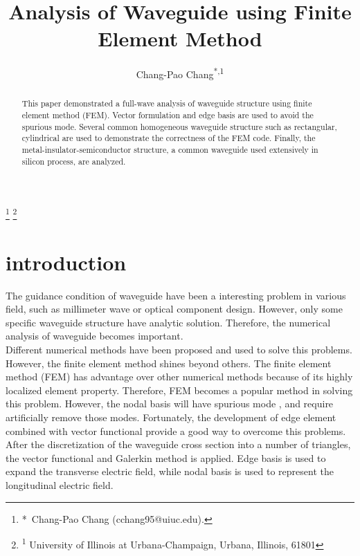 \documentclass{pj}
\begin{document}
\setcounter{page}{1}
\pjheader{}

\title{Analysis of Waveguide using Finite Element Method}

\newcommand{\defaultfigurewidth}{0.5\columnwidth}

\footnote{\hskip-0.12in*\ Chang-Pao Chang (cchang95@uiuc.edu).}
\footnote{\hskip-0.12in\textsuperscript{1} University of Illinois at Urbana-Champaign, Urbana, Illinois, 61801}

\author{Chang-Pao Chang\textsuperscript{*,1}}



\begin{abstract}
	This paper demonstrated a full-wave analysis of waveguide structure using finite element method (FEM). Vector formulation and edge basis are used to avoid the spurious mode. Several common homogeneous waveguide structure such as rectangular, cylindrical are used to demonstrate the correctness of the FEM code. Finally, the metal-insulator-semiconductor structure, a common waveguide used extensively in silicon process, are analyzed.
\end{abstract}
%
\section{introduction}
\label{sec:Intro}
The guidance condition of waveguide have been a interesting problem in various field, such as millimeter wave or optical component design. However, only some specific waveguide structure have analytic solution. Therefore, the numerical analysis of waveguide becomes important. \\


Different numerical methods have been proposed and used to solve this problems. However, the finite element method shines beyond others. The finite element method (FEM) has advantage over other numerical methods because of its highly localized element property. Therefore, FEM becomes a popular method in solving this problem. However, the nodal basis will have spurious mode \cite{na_JinJM_JinJM_2014_finite_element}, and require artificially remove those modes. Fortunately, the development of edge element combined with vector functional provide a good way to overcome this problems.\\


After the discretization of the waveguide cross section into a number of triangles, the vector functional and Galerkin method is applied. Edge basis is used to expand the transverse electric field, while nodal basis is used to represent the longitudinal electric field.\\
\end{document}
